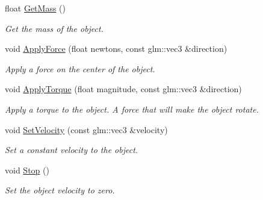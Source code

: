 \begin{DoxyCompactItemize}
float \hyperlink{classTarbora_1_1RigidBody_ad3bd01b11639862744797e2bb9c3fca0}{Get\+Mass} ()
\begin{DoxyCompactList}\small\item\em Get the mass of the object. \end{DoxyCompactList}\item 
void \hyperlink{classTarbora_1_1RigidBody_ae60a0e3d1f035698dfc11a117c28999b}{Apply\+Force} (float newtons, const glm\+::vec3 \&direction)
\begin{DoxyCompactList}\small\item\em Apply a force on the center of the object. \end{DoxyCompactList}\item 
void \hyperlink{classTarbora_1_1RigidBody_a025666d2545230e12b546b68d955871c}{Apply\+Torque} (float magnitude, const glm\+::vec3 \&direction)
\begin{DoxyCompactList}\small\item\em Apply a torque to the object. A force that will make the object rotate. \end{DoxyCompactList}\item 
void \hyperlink{classTarbora_1_1RigidBody_adeeb63271e410f12a8ccc3b7d9cb95fb}{Set\+Velocity} (const glm\+::vec3 \&velocity)
\begin{DoxyCompactList}\small\item\em Set a constant velocity to the object. \end{DoxyCompactList}\item 
\mbox{\label{classTarbora_1_1RigidBody_a9e1f015de3b1ad6ad54b93d365b6981f}} 
void \hyperlink{classTarbora_1_1RigidBody_a9e1f015de3b1ad6ad54b93d365b6981f}{Stop} ()
\begin{DoxyCompactList}\small\item\em Set the object velocity to zero. \end{DoxyCompactList}\end{DoxyCompactItemize}
